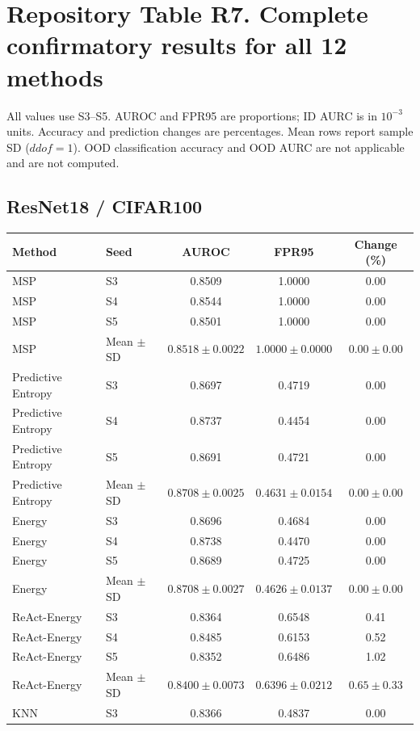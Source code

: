 \section*{Repository Table R7. Complete confirmatory results for all 12 methods}\label{tab:s7}
All values use S3--S5. AUROC and FPR95 are proportions; ID AURC is in $10^{-3}$ units. Accuracy and prediction changes are percentages. Mean rows report sample SD ($ddof=1$). OOD classification accuracy and OOD AURC are not applicable and are not computed.
\subsection*{ResNet18 / CIFAR100}
\begingroup
\footnotesize
\setlength{\tabcolsep}{3pt}
\renewcommand{\arraystretch}{1.1}
\begin{longtable}{@{}llccc@{}}
\toprule
Method & Seed & AUROC & FPR95 & Change (\%) \\
\midrule
\endhead
\bottomrule
\endlastfoot
MSP & S3 & 0.8509 & 1.0000 & 0.00 \\
MSP & S4 & 0.8544 & 1.0000 & 0.00 \\
MSP & S5 & 0.8501 & 1.0000 & 0.00 \\
MSP & Mean $\pm$ SD & $0.8518 \pm 0.0022$ & $1.0000 \pm 0.0000$ & $0.00 \pm 0.00$ \\
Predictive Entropy & S3 & 0.8697 & 0.4719 & 0.00 \\
Predictive Entropy & S4 & 0.8737 & 0.4454 & 0.00 \\
Predictive Entropy & S5 & 0.8691 & 0.4721 & 0.00 \\
Predictive Entropy & Mean $\pm$ SD & $0.8708 \pm 0.0025$ & $0.4631 \pm 0.0154$ & $0.00 \pm 0.00$ \\
Energy & S3 & 0.8696 & 0.4684 & 0.00 \\
Energy & S4 & 0.8738 & 0.4470 & 0.00 \\
Energy & S5 & 0.8689 & 0.4725 & 0.00 \\
Energy & Mean $\pm$ SD & $0.8708 \pm 0.0027$ & $0.4626 \pm 0.0137$ & $0.00 \pm 0.00$ \\
ReAct-Energy & S3 & 0.8364 & 0.6548 & 0.41 \\
ReAct-Energy & S4 & 0.8485 & 0.6153 & 0.52 \\
ReAct-Energy & S5 & 0.8352 & 0.6486 & 1.02 \\
ReAct-Energy & Mean $\pm$ SD & $0.8400 \pm 0.0073$ & $0.6396 \pm 0.0212$ & $0.65 \pm 0.33$ \\
KNN & S3 & 0.8366 & 0.4837 & 0.00 \\

\end{longtable}
